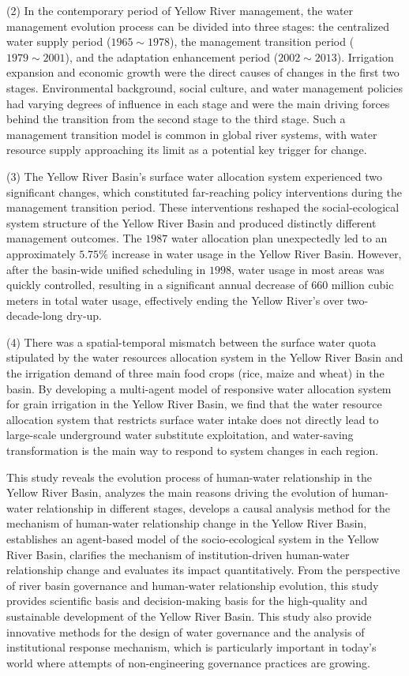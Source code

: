 \begin{eabstract}
  (2) In the contemporary period of Yellow River management, the water management evolution process can be divided into three stages: the centralized water supply period ($1965 \sim 1978$), the management transition period ($1979 \sim 2001$), and the adaptation enhancement period ($2002 \sim 2013$). Irrigation expansion and economic growth were the direct causes of changes in the first two stages. Environmental background, social culture, and water management policies had varying degrees of influence in each stage and were the main driving forces behind the transition from the second stage to the third stage. Such a management transition model is common in global river systems, with water resource supply approaching its limit as a potential key trigger for change.
  
  (3) The Yellow River Basin's surface water allocation system experienced two significant changes, which constituted far-reaching policy interventions during the management transition period. These interventions reshaped the social-ecological system structure of the Yellow River Basin and produced distinctly different management outcomes. The $1987$ water allocation plan unexpectedly led to an approximately $5.75\%$ increase in water usage in the Yellow River Basin. However, after the basin-wide unified scheduling in $1998$, water usage in most areas was quickly controlled, resulting in a significant annual decrease of $660$ million cubic meters in total water usage, effectively ending the Yellow River's over two-decade-long dry-up.
  
  (4) There was a spatial-temporal mismatch between the surface water quota stipulated by the water resources allocation system in the Yellow River Basin and the irrigation demand of three main food crops (rice, maize and wheat) in the basin. By developing a multi-agent model of responsive water allocation system for grain irrigation in the Yellow River Basin, we find that the water resource allocation system that restricts surface water intake does not directly lead to large-scale underground water substitute exploitation, and water-saving transformation is the main way to respond to system changes in each region.

  This study reveals the evolution process of human-water relationship in the Yellow River Basin, analyzes the main reasons driving the evolution of human-water relationship in different stages, develops a causal analysis method for the mechanism of human-water relationship change in the Yellow River Basin, establishes an agent-based model of the socio-ecological system in the Yellow River Basin, clarifies the mechanism of institution-driven human-water relationship change and evaluates its impact quantitatively. 
  From the perspective of river basin governance and human-water relationship evolution, this study provides scientific basis and decision-making basis for the high-quality and sustainable development of the Yellow River Basin. This study also provide innovative methods for the design of water governance and the analysis of institutional response mechanism, which is particularly important in today's world where attempts of non-engineering governance practices are growing.

\end{eabstract}


